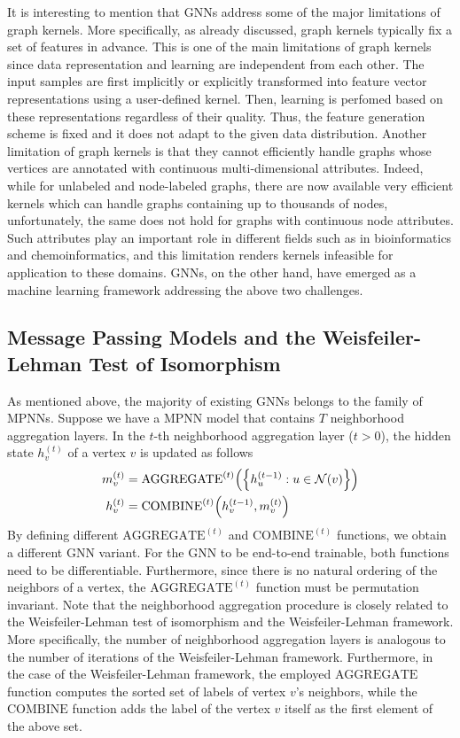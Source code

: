 \documentclass[twoside,11pt]{article}
\begin{document}
It is interesting to mention that GNNs address some of the major limitations of graph kernels.
More specifically, as already discussed, graph kernels typically fix a set of features in advance.
This is one of the main limitations of graph kernels since data representation and learning are independent from each other.
The input samples are first implicitly or explicitly transformed into feature vector representations using a user-defined kernel.
Then, learning is perfomed based on these representations regardless of their quality.
Thus, the feature generation scheme is fixed and it does not adapt to the given data distribution.
Another limitation of graph kernels is that they cannot efficiently handle graphs whose vertices are annotated with continuous multi-dimensional attributes.
Indeed, while for unlabeled and node-labeled graphs, there are now available very efficient kernels which can handle graphs containing up to thousands of nodes, unfortunately, the same does not hold for graphs with continuous node attributes. 
Such attributes play an important role in different fields such as in bioinformatics and chemoinformatics, and this limitation renders kernels infeasible for application to these domains.
GNNs, on the other hand, have emerged as a machine learning framework addressing the above two challenges.

\subsection{Message Passing Models and the Weisfeiler-Lehman Test of Isomorphism}
As mentioned above, the majority of existing GNNs belongs to the family of MPNNs.
Suppose we have a MPNN model that contains $T$ neighborhood aggregation layers.
In the $t$-th neighborhood aggregation layer ($t > 0$), the hidden state $h_v^{(t)}$ of a vertex $v$ is updated as follows
\begin{equation}
    \begin{split}
        m_v^{(t)} &= \text{AGGREGATE}^{(t)}  \Bigl( \Bigl\{ h_u^{(t-1)} :  u \in \mathcal{N}(v) \Bigr\} \Bigr) \\
        h_v^{(t)} &= \text{COMBINE}^{(t)}  \Bigl( h_v^{(t-1)}, m_v^{(t)}  \Bigr)
    \end{split}
    \label{eq:gnn_general}
\end{equation}
By defining different $\text{AGGREGATE}^{(t)}$ and $\text{COMBINE}^{(t)}$ functions, we obtain a different GNN variant.
For the GNN to be end-to-end trainable, both functions need to be differentiable.
Furthermore, since there is no natural ordering of the neighbors of a vertex, the $\text{AGGREGATE}^{(t)}$ function must be permutation invariant.
Note that the neighborhood aggregation procedure is closely related to the Weisfeiler-Lehman test of isomorphism and the Weisfeiler-Lehman framework.
More specifically, the number of neighborhood aggregation layers is analogous to the number of iterations of the Weisfeiler-Lehman framework.
Furthermore, in the case of the Weisfeiler-Lehman framework, the employed $\text{AGGREGATE}$ function computes the sorted set of labels of vertex $v$'s neighbors, while the $\text{COMBINE}$ function adds the label of the vertex $v$ itself as the first element of the above set.
\end{document}
